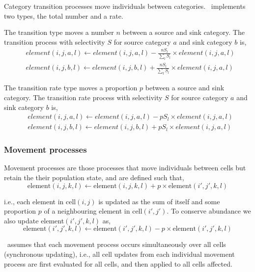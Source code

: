 Category transition processes move individuals between categories. \SPM\ implements two types, the total number and a rate. 

The transition type moves a number $n$ between a source and sink category. The transition process with selectivity $S$ for source category $a$ and sink category $b$ is,
\begin{equation}\begin{split}
  & element(i,j,a,l) \leftarrow element(i,j,a,l) - \frac{nS_l}{\sum\limits_l S_l} \times element(i,j,a,l) \\
  & element(i,j,b,l) \leftarrow element(i,j,b,l) + \frac{nS_l}{\sum\limits_l S_l} \times element(i,j,a,l)
\end{split}\end{equation}

The transition rate type moves a proportion $p$ between a source and sink category. The transition rate process with selectivity $S$ for source category $a$ and sink category $b$ is,
\begin{equation}\begin{split}
  & element(i,j,a,l) \leftarrow element(i,j,a,l) - pS_l \times element(i,j,a,l) \\
  & element(i,j,b,l) \leftarrow element(i,j,b,l) + pS_l \times element(i,j,a,l)
\end{split}\end{equation}

\subsubsection{Movement processes}

Movement processes are those processes that move individuals between cells but retain the their population state, and are defined such that,
\begin{equation}
\text{element}(i,j,k,l)\leftarrow \text{element}(i,j,k,l) + p \times \text{element}(i',j',k,l)
\end{equation}

i.e., each element in cell$(i,j)$ is updated as the sum of itself and some proportion $p$ of a neighbouring element in cell$(i',j')$. To conserve abundance we also update element$(i',j',k,l)$ as,
\begin{equation}
\text{element}(i',j',k,l)\leftarrow \text{element}(i',j',k,l) - p\times \text{element}(i',j',k,l)
\end{equation}

\SPM\ assumes that each movement process occurs simultaneously over all cells (synchronous updating), i.e., all cell updates from each individual movement process are first evaluated for all cells, and then applied to all cells affected. 

